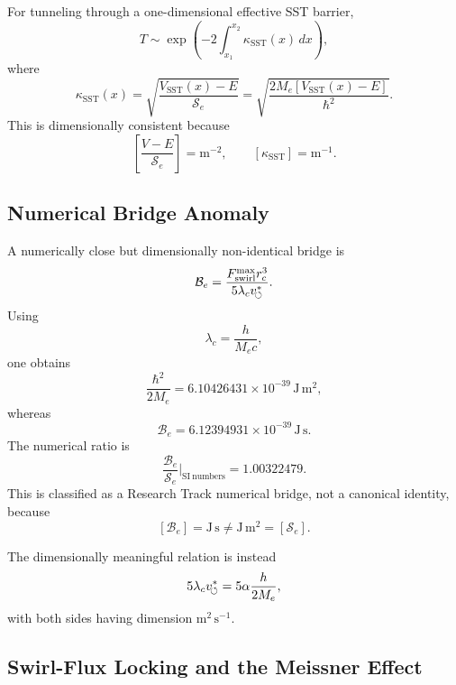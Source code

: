         For tunneling through a one-dimensional effective SST barrier,
        \[
            T
            \sim
            \exp\left(
                    -2\int_{x_1}^{x_2}\kappa_{\mathrm{SST}}(x)\,dx
            \right),
        \]
        where
        \[
            \kappa_{\mathrm{SST}}(x)
            =
            \sqrt{
                \frac{V_{\mathrm{SST}}(x)-E}{\mathcal S_e}
            }
            =
            \sqrt{
                \frac{2M_e\left[V_{\mathrm{SST}}(x)-E\right]}{\hbar^2}
            }.
        \]
        This is dimensionally consistent because
        \[
            \left[
                \frac{V-E}{\mathcal S_e}
            \right]
            =
            \mathrm{m^{-2}},
            \qquad
            [\kappa_{\mathrm{SST}}]=\mathrm{m^{-1}}.
        \]
    
    \subsection{Numerical Bridge Anomaly}
        
        A numerically close but dimensionally non-identical bridge is
        \[
            \mathcal B_e
            =
            \frac{F_{\text{swirl}}^{\max} r_c^3}
            {5\lambda_cv_{\!\boldsymbol{\circlearrowleft}}^{\ast}}.
        \]
        Using
        \[
            \lambda_c=\frac{h}{M_e c},
        \]
        one obtains
        \[
            \frac{\hbar^2}{2M_e}
            =
            6.10426431\times10^{-39}\,\mathrm{J\,m^2},
        \]
        whereas
        \[
            \mathcal B_e
            =
            6.12394931\times10^{-39}\,\mathrm{J\,s}.
        \]
        The numerical ratio is
        \[
            \frac{\mathcal B_e}{\mathcal S_e}\bigg|_{\mathrm{SI\ numbers}}
            =
            1.00322479.
        \]
        This is classified as a Research Track numerical bridge, not a canonical
        identity, because
        \[
            [\mathcal B_e]=\mathrm{J\,s}
            \neq
            \mathrm{J\,m^2}=[\mathcal S_e].
        \]
        
        The dimensionally meaningful relation is instead
        \[
            5\lambda_cv_{\!\boldsymbol{\circlearrowleft}}^{\ast}
            =
            5\alpha\frac{h}{2M_e},
        \]
        with both sides having dimension \(\mathrm{m^2\,s^{-1}}\).
    
    \subsection{Swirl-Flux Locking and the Meissner Effect}
        
